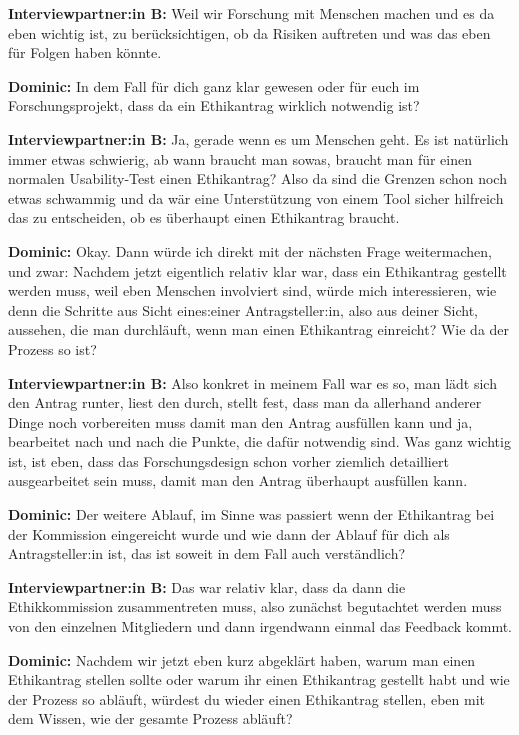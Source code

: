 \documentclass[a4paper,12pt,twoside]{scrreprt}
\begin{document}
\textbf{Interviewpartner:in B:} Weil wir Forschung mit Menschen machen und es da eben wichtig ist, zu berücksichtigen, ob da Risiken auftreten und was das eben für Folgen haben könnte.

\textbf{Dominic:} In dem Fall für dich ganz klar gewesen oder für euch im Forschungsprojekt, dass da ein Ethikantrag wirklich notwendig ist?

\textbf{Interviewpartner:in B:} Ja, gerade wenn es um Menschen geht. Es ist natürlich immer etwas schwierig, ab wann braucht man sowas, braucht man für einen normalen Usability-Test einen Ethikantrag? Also da sind die Grenzen schon noch etwas schwammig und da wär eine Unterstützung von einem Tool sicher hilfreich das zu entscheiden, ob es überhaupt einen Ethikantrag braucht.

\textbf{Dominic:} Okay. Dann würde ich direkt mit der nächsten Frage weitermachen, und zwar: Nachdem jetzt eigentlich relativ klar war, dass ein Ethikantrag gestellt werden muss, weil eben Menschen involviert sind, würde mich interessieren, wie denn die Schritte aus Sicht eines:einer Antragsteller:in, also aus deiner Sicht, aussehen, die man durchläuft, wenn man einen Ethikantrag einreicht? Wie da der Prozess so ist?

\textbf{Interviewpartner:in B:} Also konkret in meinem Fall war es so, man lädt sich den Antrag runter, liest den durch, stellt fest, dass man da allerhand anderer Dinge noch vorbereiten muss damit man den Antrag ausfüllen kann und ja, bearbeitet nach und nach die Punkte, die dafür notwendig sind. Was ganz wichtig ist, ist eben, dass das Forschungsdesign schon vorher ziemlich detailliert ausgearbeitet sein muss, damit man den Antrag überhaupt ausfüllen kann.

\textbf{Dominic:} Der weitere Ablauf, im Sinne was passiert wenn der Ethikantrag bei der Kommission eingereicht wurde und wie dann der Ablauf für dich als Antragsteller:in ist, das ist soweit in dem Fall auch verständlich?

\textbf{Interviewpartner:in B:} Das war relativ klar, dass da dann die Ethikkommission zusammentreten muss, also zunächst begutachtet werden muss von den einzelnen Mitgliedern und dann irgendwann einmal das Feedback kommt.

\textbf{Dominic:} Nachdem wir jetzt eben kurz abgeklärt haben, warum man einen Ethikantrag stellen sollte oder warum ihr einen Ethikantrag gestellt habt und wie der Prozess so abläuft, würdest du wieder einen Ethikantrag stellen, eben mit dem Wissen, wie der gesamte Prozess abläuft?
\end{document}

